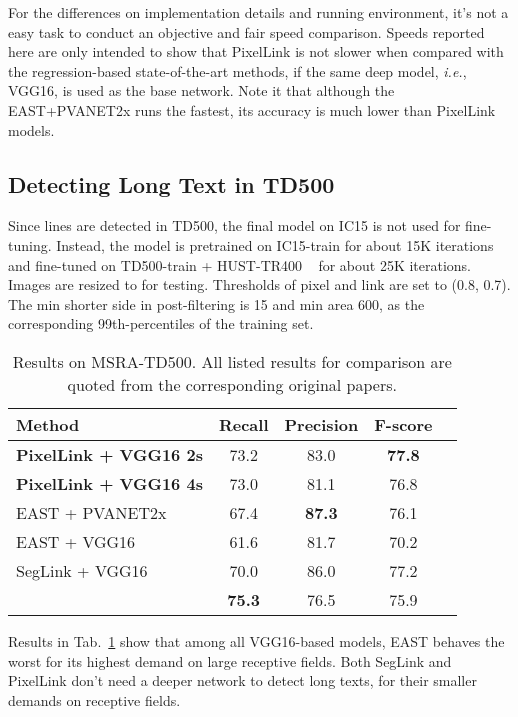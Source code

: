 \documentclass[letterpaper]{article} \usepackage{aaai18}  \usepackage{times}  \usepackage{helvet}  \usepackage{courier}  \usepackage{url}  \usepackage{graphicx}
\begin{document}
	For the differences on implementation details and running environment, it's not a easy task to conduct an objective and fair speed comparison. Speeds reported here are only intended to show that PixelLink is not slower when compared with the regression-based state-of-the-art methods, if the same deep model, \emph{i.e.}, VGG16, is used as the base network. Note it that although the EAST+PVANET2x runs the fastest, its accuracy is much lower than PixelLink models.
	
	
	\subsection{Detecting Long Text in TD500}
	Since lines are detected in TD500, the final model on IC15 is not used for fine-tuning. Instead, the model is pretrained on IC15-train for about 15K iterations and fine-tuned on TD500-train + HUST-TR400 ~\cite{Yao2014TR400} for about 25K iterations. Images are resized to  for testing. Thresholds of pixel and link are set to (0.8, 0.7). The min shorter side in post-filtering is 15 and min area 600, as the corresponding 99th-percentiles of the training set.
	
	\begin{table}
		\centering
		\caption{Results on MSRA-TD500.  All listed results for comparison are quoted from the corresponding original papers.}
		\label{table:results-on-msra-td500}
		\begin{tabular}{|l|c|c|c|c|}
			\hline
			Method              &Recall     &Precision      &F-score\\
			\hline
			\hline
			\textbf{PixelLink + VGG16 2s}    &73.2   &83.0   &\textbf{77.8} \\
			\hline
			\textbf{PixelLink + VGG16 4s}    &73.0   &81.1   &76.8 \\
			\hline
			EAST + PVANET2x       &67.4   &\textbf{87.3}  &76.1 \\
			\hline
			EAST + VGG16        &61.6   &81.7   &70.2 \\
			\hline
			SegLink + VGG16     &70.0   &86.0   &77.2 \\
			\hline
			\cite{yao2016scene} &\textbf{75.3}  &76.5   &75.9 \\
			\hline
		\end{tabular}
	\end{table}
	
	Results in Tab.~\ref{table:results-on-msra-td500} show that among all VGG16-based models, EAST behaves the worst for its highest demand on large receptive fields. Both SegLink and PixelLink don't need a deeper network to detect long texts, for their smaller demands on receptive fields.
\end{document}
